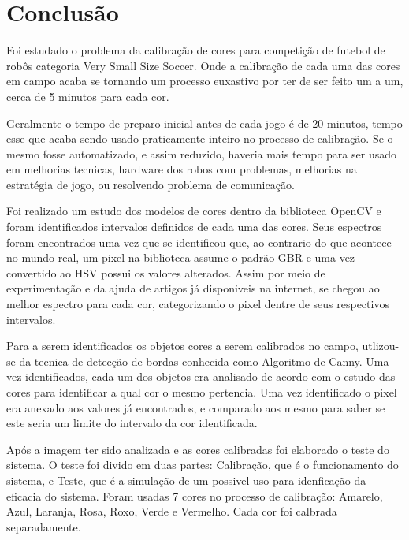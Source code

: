 
\chapter{Conclusão} \label{Cap:Conclusao}


Foi estudado o problema da calibração de cores para competição de futebol de robôs categoria Very Small Size Soccer. Onde a calibração de cada uma das cores em campo acaba se tornando um processo euxastivo por ter de ser feito um a um, cerca de 5 minutos para cada cor. 

Geralmente o tempo de preparo inicial antes de cada jogo é de 20 minutos, tempo esse que acaba sendo usado praticamente inteiro no processo de calibração. Se o mesmo fosse automatizado, e assim reduzido, haveria mais tempo para ser usado em melhorias tecnicas, hardware dos robos com problemas, melhorias na estratégia de jogo, ou resolvendo problema de comunicação.

	Foi realizado um estudo dos modelos de cores dentro da biblioteca OpenCV e foram identificados intervalos definidos de cada uma das cores. Seus espectros foram encontrados uma vez que se identificou que, ao contrario do que acontece no mundo real, um pixel na biblioteca assume o  padrão GBR e uma vez convertido ao HSV possui os valores alterados. Assim por meio de experimentação e da ajuda de artigos já disponiveis na internet, se chegou ao melhor espectro para cada cor, categorizando o pixel dentre de seus respectivos intervalos.

Para a serem identificados os objetos cores a serem calibrados no campo, utlizou-se da tecnica de detecção de bordas conhecida como Algoritmo de Canny. Uma vez identificados, cada um dos objetos era analisado de acordo com o estudo das cores para identificar a qual cor o mesmo pertencia. Uma vez identificado o pixel era anexado aos valores já encontrados, e comparado aos mesmo para saber se este seria um limite do intervalo da cor identificada.

Após a imagem ter sido analizada e as cores calibradas foi elaborado o teste do sistema. O teste foi divido em duas partes: Calibração, que é o funcionamento do sistema, e Teste, que é a simulação de um possivel uso para idenficação da eficacia do sistema. Foram usadas 7 cores no processo de calibração: Amarelo, Azul, Laranja, Rosa, Roxo, Verde e Vermelho. Cada cor foi calbrada separadamente.